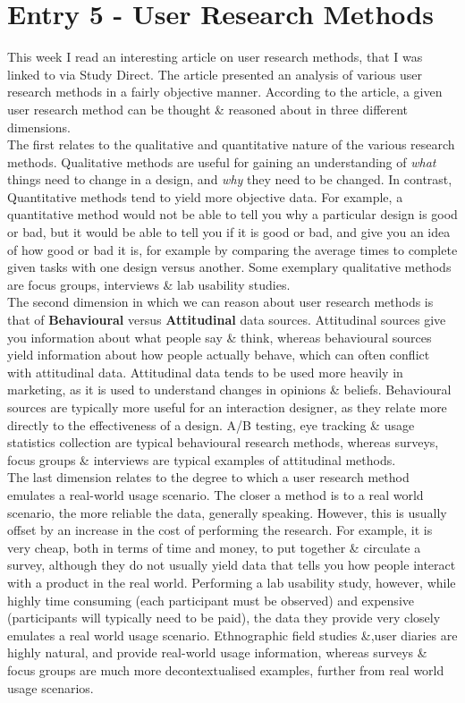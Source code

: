 \documentclass{article}
\begin{document}
\section*{Entry 5 - User Research Methods}

\noindent This week I read an interesting article on user research methods, that I was linked to via Study Direct. The article presented an analysis of various user research methods in a fairly objective manner. According to the article, a given user research method can be thought \& reasoned about in three different dimensions.
\\\indent The first relates to the qualitative and quantitative nature of the various research methods. Qualitative methods are useful for gaining an understanding of \emph{what} things need to change in a design, and \emph{why} they need to be changed. In contrast, Quantitative methods tend to yield more objective data. For example, a quantitative method would not be able to tell you why a particular design is good or bad, but it would be able to tell you if it is good or bad, and give you an idea of how good or bad it is, for example by comparing the average times to complete given tasks with one design versus another. Some exemplary qualitative methods are focus groups, interviews \& lab usability studies.
\\\indent The second dimension in which we can reason about user research methods is that of \textbf{Behavioural} versus \textbf{Attitudinal} data sources. Attitudinal sources give you information about what people say \& think, whereas behavioural sources yield information about how people actually behave, which can often conflict with attitudinal data. Attitudinal data tends to be used more heavily in marketing, as it is used to understand changes in opinions \& beliefs. Behavioural sources are typically more useful for an interaction designer, as they relate more directly to the effectiveness of a design. A/B testing, eye tracking \& usage statistics collection are typical behavioural research methods, whereas surveys, focus groups \& interviews are typical examples of attitudinal methods.
\\\indent The last dimension relates to the degree to which a user research method emulates a real-world usage scenario. The closer a method is to a real world scenario, the more reliable the data, generally speaking. However, this is usually offset by an increase in the cost of performing the research. For example, it is very cheap, both in terms of time and money, to put together \& circulate a survey, although they do not usually yield data that tells you how people interact with a product in the real world. Performing a lab usability study, however, while highly time consuming (each participant must be observed) and expensive (participants will typically need to be paid), the data they provide very closely emulates a real world usage scenario. Ethnographic field studies \&,user diaries are highly natural, and provide real-world usage information, whereas surveys \& focus groups are much more decontextualised examples, further from real world usage scenarios.
\end{document}
